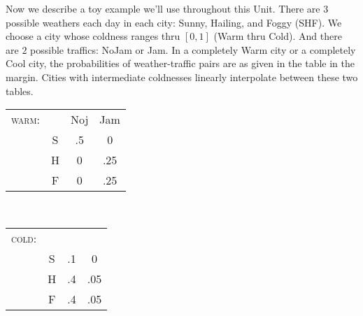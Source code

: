 



%
%
Now we describe a toy example we'll use throughout this Unit.  There are $3$
possible weathers each day in each city: Sunny, Hailing, and Foggy (SHF).  We
choose a city whose coldness ranges thru $[0,1]$ (Warm thru Cold).  And there
are $2$ possible traffics: NoJam or Jam.   In a completely Warm city or a
completely Cool city, the probabilities of weather-traffic pairs are
as given in the table in the margin.  Cities with intermediate coldnesses linearly interpolate between these two
tables.
%
      \begin{marginfigure}[-2cm]
      \centering
      \begin{tabular}{cccc}
        \textsc{warm}:&  &Noj & Jam \\%
              & S& .5 &0  \\
              & H& 0  &.25\\
              & F& 0  &.25
      \end{tabular}\\
      \begin{tabular}{cccc}
        \textsc{cold}:& &     &     \\%
             &S&.1  &0  \\
             &H&.4  &.05\\
             &F&.4  &.05
      \end{tabular}
  \end{marginfigure}


